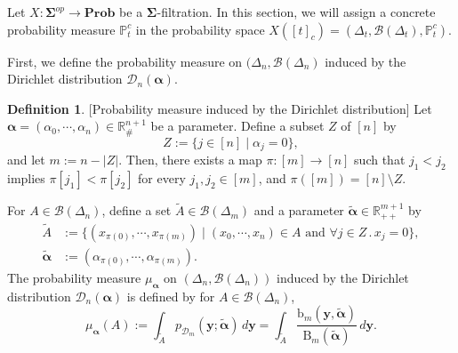 \documentclass[12pt, a4paper]{amsart}
\theoremstyle{plain}
\theoremstyle{definition}
\newtheorem{defn}[thm]{Definition}
\numberwithin{figure}{section}
\numberwithin{table}{section}
\newcommand{\abs}[1]{
  \lvert  #1 \rvert
}
\newcommand{\twc}[2]{ %
  [ #1 ]_{ #2 }
}
\numberwithin{equation}{section}
\newcommand{\Prob}{\mathbf{Prob}}
\newcommand{\bSigma}{\mathbf{\Sigma}}
\begin{document}
Let
$
X : \bSigma^{op} \to \Prob
$
be a 
$\bSigma$-filtration.
%
In this section,
we will assign a concrete probability measure 
$
\mathbb{P}^c_t
$
in the probability space
$
X
(\twc{t}{c})
	=
(\Delta_t, \mathcal{B}(\Delta_t), 
\mathbb{P}^c_t
)
$.

First, we define the probability measure on 
$
(\Delta_n, \mathcal{B}(\Delta_n)
$
induced by the Dirichlet distribution
$
\mathcal{D}_n(\boldsymbol{\alpha})
$.


\begin{defn}{[Probability measure induced by the Dirichlet distribution]}
\label{defn:indPMdiri}
Let
$
\boldsymbol{\alpha} 
	=
(\alpha_0, \cdots, \alpha_n)
	\in
\mathbb{R}_{\#}^{n+1}
$ 
be a parameter.
Define a subset 
$Z$
of
$[n]$
by
\[
Z%
	:=
\{
	j \in [n]
\mid
	\alpha_j = 0
\} ,
\]
and let
$
m
	:=
n - \abs{Z} .
$
Then, there exists a map
$
\pi
	:
[m] \to [n]
$
such that
$
j_1 < j_2
$
implies
$
\pi[j_1] < \pi[j_2]
$
for every
$
j_1, j_2
	\in
[m]
$,
and
$
\pi([m])
	=
[n] \setminus Z .
$

For
$
A
	\in
\mathcal{B}(\Delta_n)
$,
define a set
$
\tilde{A}
	\in
\mathcal{B}(\Delta_m)
$
and a parameter
$
\tilde{
	\boldsymbol{\alpha}
}
	\in
\mathbb{R}_{++}^{m+1}
$
by
\begin{align*}
\tilde{A}
	&:=
\{
	(x_{\pi(0)}, \cdots, x_{\pi(m)})
\mid
	(x_0, \cdots, x_n) \in A
		\textrm{ and }
	\forall j \in Z \,.\, x_j = 0
\},
		\\
\tilde{
	\boldsymbol{\alpha}
}
	&:=
(
	\alpha_{\pi(0)}, 
	\cdots,
	\alpha_{\pi(m)} 
) .
\end{align*}
The probability measure
$
\mu_{
	\boldsymbol{\alpha}
}
$
on
$
(\Delta_n, \mathcal{B}(\Delta_n))
$
induced by the Dirichlet distribution
$
\mathcal{D}_n(
	\boldsymbol{\alpha}
)
$
is
defined by
for
$A \in \mathcal{B}(\Delta_n)$,
\begin{equation}
\label{eq:IndMeasByDiriDist}
\mu_{
	\boldsymbol{\alpha}
}
(A)
	:=
\int_{
	\tilde{A}
}
	p_{\mathcal{D}_m}(
		\mathbf{y};
		\tilde{
			\boldsymbol{\alpha}
		}
	)
\, d \mathbf{y}
	=
\int_{
	\tilde{A}
}
	\frac{
		\mathrm{b}_m(\mathbf{y}, 
			\tilde{\boldsymbol{\alpha}}
		)
	}{
		\mathrm{B}_m(
			\tilde{\boldsymbol{\alpha}}
		)
	} 
\, d \mathbf{y} .
\end{equation}

\end{defn}
\end{document}
